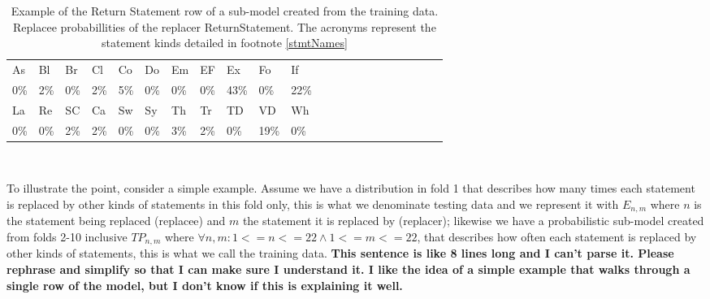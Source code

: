 \documentclass[conference]{IEEEtran}
\newcommand{\todo}[1]
  {{\scriptsize \textbf{\color{red} {#1}}}}
\begin{document}
\begin{table}[ht]
\begin{tabular}{llllllllllllllllllllll}
\hline
As & Bl & Br & Cl & Co & Do & Em & EF & Ex & Fo & If \\
0\%&2\%&0\%&2\%&5\%&0\%&0\%&0\%&43\%&0\%&22\% \\
\hline 
La & Re & SC & Ca & Sw & Sy & Th & Tr & TD & VD & Wh \\
0\%&0\%&2\%&2\%&0\%&0\%&3\%&2\%&0\%&19\%&0\% \\
\hline
\end{tabular}
\\
\caption{Example of the Return Statement row of a sub-model created from 
the training data. Replacee probabillities of the replacer ReturnStatement. The acronyms represent the statement kinds detailed in footnote \ref{stmtNames}}
 \label{fig:exPredReturn} 
\end{table} 

% 

To illustrate the point, consider a simple example. Assume we have a 
distribution in fold 1 that describes how many times each statement is replaced 
by other kinds of statements in this fold 
only, this is what we denominate testing data and we represent it with $E_{n,m}$ 
where $n$ is the statement being replaced (replacee) and $m$ the statement it is 
replaced by (replacer); likewise we have a probabilistic sub-model created from 
folds 2-10 inclusive $TP_{n,m}$ where $\forall n,m: 1<=n<=22 \land 1<=m<=22$, 
that describes how often each statement is replaced by 
other kinds of statements, this is what we call the training data. \todo{This
  sentence is like 8 lines long and I can't parse it.  Please rephrase and
  simplify so that I can make sure I understand it.  I like the idea of a simple
  example that walks through a single row of the model, but I don't know if this
  is explaining it well.}
\end{document}
